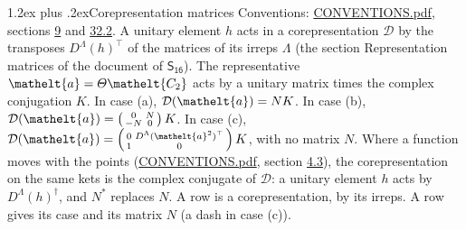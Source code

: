 \documentclass[10pt,a4paper]{article}
\makeatletter
\renewcommand\section{\@startsection{section}{1}{\z@}{-3ex plus -1ex minus -.2ex}%
  {1.2ex plus .2ex}{\normalfont\large\sffamily\bfseries\color{parttitle}}}
\numberwithin{equation}{section}
\newcommand{\eltfont}[1]{{\let\sigma\eltsigma\mathelt{#1}}}
\newcommand{\grp}[1]{\mathsf{#1}}
\newcommand{\elt}[1]{\eltfont{#1}}
\makeatother
\begin{document}
\section{Corepresentation matrices}\label{s:corep_matrices}
Conventions: \href{../../CONVENTIONS.pdf}{CONVENTIONS.pdf}, sections \href{../../../rotation/CONVENTIONS.pdf\#conv.9}{9} and \href{../../CONVENTIONS.pdf\#conv.32.2}{32.2}.
A unitary element $h$ acts in a corepresentation $\mathcal{D}$ by the transposes $D^{\Lambda}(h)^{\top}$ of the matrices of its irreps $\Lambda$ (the section Representation matrices of the document of \href{../../../rotation/data/pdf/S16.pdf}{$\grp{S_{16}}$}). The representative $\elt{a} = \varTheta\elt{C_{2}}$ acts by a unitary matrix times the complex conjugation $K$.
In case (a), $\mathcal{D}(\elt{a}) = NK$. In case (b), $\mathcal{D}(\elt{a}) = \left(\begin{smallmatrix} 0 & N \\ -N & 0 \end{smallmatrix}\right) K$. In case (c), $\mathcal{D}(\elt{a}) = \left(\begin{smallmatrix} 0 & D^{\Lambda}(\elt{a}^2)^{\top} \\ 1 & 0 \end{smallmatrix}\right) K$, with no matrix $N$.
Where a function moves with the points (\href{../../CONVENTIONS.pdf}{CONVENTIONS.pdf}, section \href{../../../rotation/CONVENTIONS.pdf\#conv.4.3}{4.3}), the corepresentation on the same kets is the complex conjugate of $\mathcal{D}$: a unitary element $h$ acts by $D^{\Lambda}(h)^{\dagger}$, and $N^{*}$ replaces $N$.
A row is a corepresentation, by its irreps. A row gives its case and its matrix $N$ (a dash in case (c)).
\end{document}

